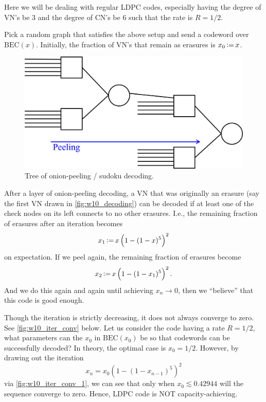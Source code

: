 Here we will be dealing with regular LDPC codes, especially having the degree of VN's be 3 and the degree of CN's be 6 such that the rate is $R=1/2$.

Pick a random graph that satisfies the above setup and send a codeword over $\mathrm{BEC}(x)$. Initially, the fraction of VN's that remain as erasures is $x_0\operatorname{\vcentcolon=} x$.
\begin{figure}[H]
    \centering
    \includegraphics[width=0.5\linewidth]{figures/w10_decoding.png}
    \caption{Tree of onion-peeling / sudoku decoding.}
    \label{fig:w10_decoding}
\end{figure}
After a layer of onion-peeling decoding, a VN that was originally an erasure (say the first VN drawn in \autoref{fig:w10_decoding}) can be decoded if at least one of the check nodes on its left connects to no other erasures. I.e., the remaining fraction of erasures after an iteration becomes
\begin{equation*}
    x_1 \operatorname{\vcentcolon=} x \left(1-(1-x)^5\right)^2
\end{equation*}
on expectation. If we peel again, the remaining fraction of erasures become
\begin{equation*}
    x_2 \operatorname{\vcentcolon=} x\left(1-(1-x_1)^5\right)^2.
\end{equation*}
And we do this again and again until achieving $x_n\rightarrow0$, then we ``believe'' that this code is good enough.

Though the iteration is strictly decreasing, it does not always converge to zero. See \autoref{fig:w10_iter_conv} below. Let us consider the code having a rate $R=1/2$, what parameters can the $x_0$ in $\mathrm{BEC}(x_0)$ be so that codewords can be successfully decoded? In theory, the optimal case is $x_0=1/2$. However, by drawing out the iteration
\begin{equation}
    x_n = x_0 \left(1-(1-x_{n-1})^5\right)^2 \label{eq:w10_iteration_example}
\end{equation}
via \autoref{fig:w10_iter_conv_1}, we can see that only when $x_0\lesssim 0.42944$ will the sequence converge to zero. Hence, LDPC code is NOT capacity-achieving.

